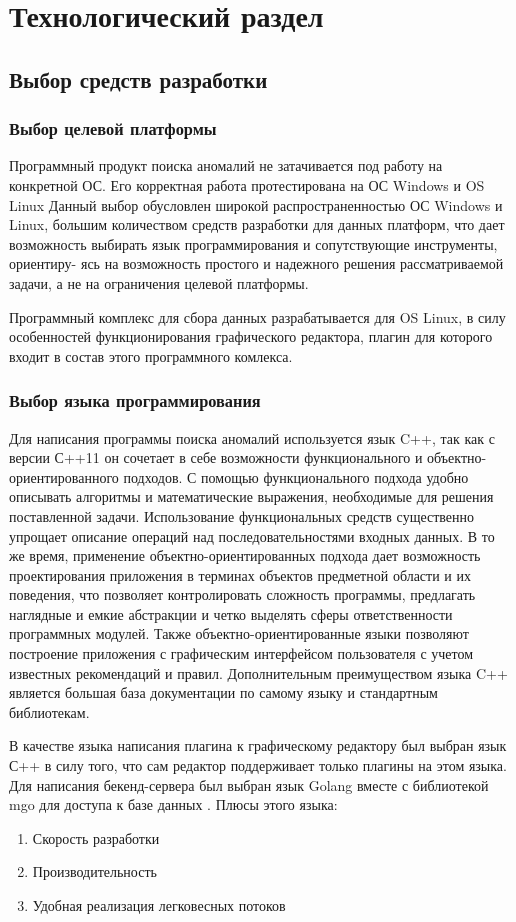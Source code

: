 \chapter{Технологический раздел}
\section{Выбор средств разработки}
\subsection{Выбор целевой платформы}
Программный продукт поиска аномалий не затачивается под работу на конкретной ОС. Его корректная работа протестирована на ОС Windows и OS Linux Данный выбор обусловлен широкой распространенностью ОС Windows и Linux, большим количеством средств разработки для данных платформ, что дает возможность выбирать
язык программирования и сопутствующие инструменты, ориентиру-
ясь на возможность простого и надежного решения рассматриваемой
задачи, а не на ограничения целевой платформы.

Программный комплекс для сбора данных разрабатывается для OS Linux, в силу особенностей функционирования графического редактора, плагин для которого входит в состав этого программного комлекса.
\subsection{Выбор языка программирования}
Для написания программы поиска аномалий используется язык C++, так
как с версии С++11 он сочетает в себе возможности функционального и
объектно-ориентированного подходов.
С помощью функционального подхода удобно описывать алгоритмы
и математические выражения, необходимые для решения поставленной
задачи. Использование функциональных средств существенно упрощает
описание операций над последовательностями входных данных.
В то же время, применение объектно-ориентированных подхода дает
возможность проектирования приложения в терминах объектов предметной
области и их поведения, что позволяет контролировать сложность
программы, предлагать наглядные и емкие абстракции и четко выделять
сферы ответственности программных модулей.
Также объектно-ориентированные языки позволяют построение приложения с графическим интерфейсом пользователя с учетом известных рекомендаций и правил.
Дополнительным преимуществом языка C++ является большая база
документации по самому языку и стандартным библиотекам.


В качестве языка написания плагина к графическому редактору был выбран язык С++ в силу того, что сам редактор поддерживает только плагины на этом языка. 
Для написания бекенд-сервера был выбран язык Golang вместе с библиотекой  mgo для доступа к базе данных . Плюсы этого языка:
\begin{enumerate}
	
	\item Скорость разработки	 	
	
	\item Производительность
	
	\item Удобная реализация легковесных потоков 
\end{enumerate}

